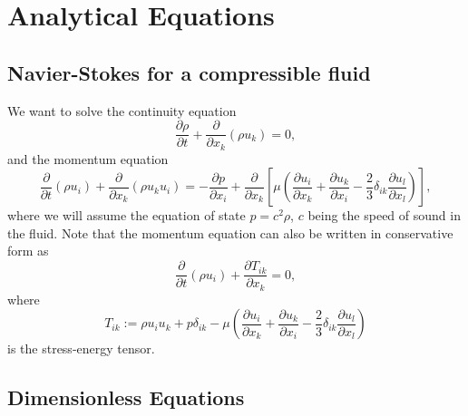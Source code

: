 \documentclass[11pt]{article}
\begin{document}
\maketitle

\section{Analytical Equations}

\subsection{Navier-Stokes for a compressible fluid}

We want to solve the continuity equation
\begin{equation}
\frac{\partial \rho}{\partial t} + \frac{\partial}{\partial x_k}\left(\rho u_k\right) = 0,
\end{equation}
and the momentum equation
\begin{equation}
\frac{\partial}{\partial t}\left(\rho u_i\right) + \frac{\partial}{\partial x_k}\left(\rho u_k u_i\right) = -\frac{\partial p}{\partial x_i} + \frac{\partial}{\partial x_k}\left[\mu\left(\frac{\partial u_i}{\partial x_k} + \frac{\partial u_k}{\partial x_i}- \frac{2}{3}\delta_{ik}\frac{\partial u_l}{\partial x_l}\right)\right],
\end{equation}
where we will assume the equation of state $p = c^2\rho$, $c$ being the speed of sound in the fluid. Note that the momentum equation can also be written in conservative form as
\begin{equation}
\frac{\partial}{\partial t}\left(\rho u_i\right) + \frac{\partial T_{ik}}{\partial x_k} = 0,
\end{equation}
where
\begin{equation}
T_{ik} := \rho u_i u_k + p\delta_{ik} - \mu\left(\frac{\partial u_i}{\partial x_k} + \frac{\partial u_k}{\partial x_i}- \frac{2}{3}\delta_{ik}\frac{\partial u_l}{\partial x_l}\right)
\end{equation}
is the stress-energy tensor.

\subsection{Dimensionless Equations}
\end{document}
